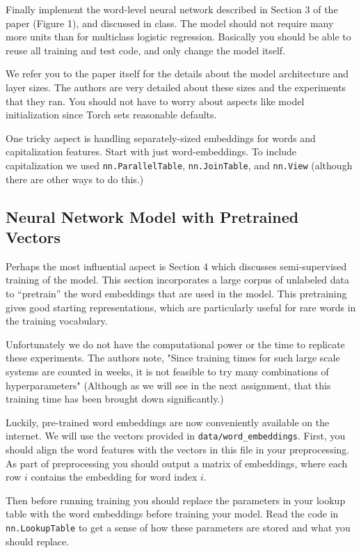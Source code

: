 \documentclass[11pt]{article}
\begin{document}
Finally implement the word-level neural network described in Section 3
of the paper (Figure 1), and discussed in class. The model should not
require many more units than for multiclass logistic
regression. Basically you should be able to reuse all training and
test code, and only change the model itself.

We refer you to the paper itself for the details about the model
architecture and layer sizes. The authors are very detailed about
these sizes and the experiments that they ran. You should not have to
worry about aspects like model initialization since Torch sets
reasonable defaults.

One tricky aspect is handling separately-sized embeddings for words
and capitalization features. Start with just word-embeddings.  To
include capitalization we used \texttt{nn.ParallelTable},
\texttt{nn.JoinTable}, and \texttt{nn.View} (although there are other
ways to do this.)


\subsection{Neural Network Model with Pretrained Vectors}

Perhaps the most influential aspect is Section 4 which discusses
semi-supervised training of the model. This section incorporates a
large corpus of unlabeled data to ``pretrain'' the word embeddings
that are used in the model. This pretraining gives good starting
representations, which are particularly useful for rare words in the 
training vocabulary.


Unfortunately we do not have the computational power or the time to
replicate these experiments. The authors note, "Since training times
for such large scale systems are counted in weeks, it is not feasible
to try many combinations of hyperparameters" (Although as we will see
in the next assignment, that this training time has been brought down
significantly.)
 
Luckily, pre-trained word embeddings are now conveniently available on
the internet. We will use the vectors provided in
\texttt{data/word\_embeddings}. First, you should align the word
features with the vectors in this file in your preprocessing. 
As part of preprocessing you should output a matrix of
embeddings, where each row $i$ contains the embedding for 
word index $i$.

Then before running training you should replace the parameters in your
lookup table with the word embeddings before training your model. Read
the code in \texttt{nn.LookupTable} to get a sense of how these
parameters are stored and what you should replace.
\end{document}
